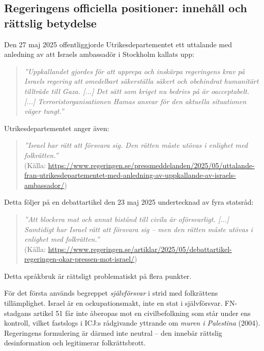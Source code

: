 

\subsection{Regeringens officiella positioner: innehåll och rättslig betydelse}

Den 27 maj 2025 offentliggjorde Utrikesdepartementet ett uttalande med anledning av att Israels ambassadör i Stockholm kallats upp:

\begin{quote}
\textit{”Uppkallandet gjordes för att upprepa och inskärpa regeringens krav på Israels regering att omedelbart säkerställa säkert och obehindrat humanitärt tillträde till Gaza. [...] Det sätt som kriget nu bedrivs på är oacceptabelt. [...] Terroristorganisationen Hamas ansvar för den aktuella situationen väger tungt.”}
\end{quote}

Utrikesdepartementet anger även:
\begin{quote}
\textit{”Israel har rätt att försvara sig. Den rätten måste utövas i enlighet med folkrätten.”}\\
(Källa: \url{https://www.regeringen.se/pressmeddelanden/2025/05/uttalande-fran-utrikesdepartementet-med-anledning-av-uppkallande-av-israels-ambassador/})
\end{quote}

Detta följer på en debattartikel den 23 maj 2025 undertecknad av fyra statsråd:

\begin{quote}
\textit{”Att blockera mat och annat bistånd till civila är oförsvarligt. [...] Samtidigt har Israel rätt att försvara sig – men den rätten måste utövas i enlighet med folkrätten.”}\\
(Källa: \url{https://www.regeringen.se/artiklar/2025/05/debattartikel-regeringen-okar-pressen-mot-israel/})
\end{quote}

\medskip

Detta språkbruk är rättsligt problematiskt på flera punkter.

För det första används begreppet \textit{självförsvar} i strid med folkrättens tillämplighet. Israel är en ockupationsmakt, inte en stat i självförsvar. FN-stadgans artikel 51 får inte åberopas mot en civilbefolkning som står under ens kontroll, vilket fastslogs i ICJ:s rådgivande yttrande om \textit{muren i Palestina} (2004). Regeringens formulering är därmed inte neutral – den innebär rättslig desinformation och legitimerar folkrättsbrott.

